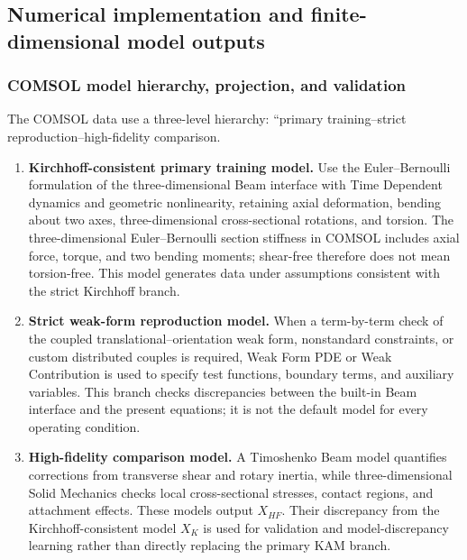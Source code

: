 \subsection{Numerical implementation and finite-dimensional model outputs}\label{sec:galerkin-2-11}

\subsubsection{COMSOL model hierarchy, projection, and validation}\label{sec:galerkin-2-11-1}

The COMSOL data use a three-level hierarchy: ``primary training--strict reproduction--high-fidelity comparison.

\begin{enumerate}
\def\labelenumi{\arabic{enumi}.}
\tightlist
\item
  \textbf{Kirchhoff-consistent primary training model.} Use the Euler--Bernoulli formulation of the three-dimensional Beam interface with Time Dependent dynamics and geometric nonlinearity, retaining axial deformation, bending about two axes, three-dimensional cross-sectional rotations, and torsion. The three-dimensional Euler--Bernoulli section stiffness in COMSOL includes axial force, torque, and two bending moments; shear-free therefore does not mean torsion-free\cite{COMSOLBeamInterface2025,COMSOLSectionStiffness2025}. This model generates data under assumptions consistent with the strict Kirchhoff branch.
\item
  \textbf{Strict weak-form reproduction model.} When a term-by-term check of the coupled translational--orientation weak form, nonstandard constraints, or custom distributed couples is required, Weak Form PDE or Weak Contribution is used to specify test functions, boundary terms, and auxiliary variables\cite{COMSOLWeakFormPDE2025,COMSOLWeakContribution2025}. This branch checks discrepancies between the built-in Beam interface and the present equations; it is not the default model for every operating condition.
\item
  \textbf{High-fidelity comparison model.} A Timoshenko Beam model quantifies corrections from transverse shear and rotary inertia, while three-dimensional Solid Mechanics checks local cross-sectional stresses, contact regions, and attachment effects. These models output \(X_{HF}\). Their discrepancy from the Kirchhoff-consistent model \(X_{K}\) is used for validation and model-discrepancy learning rather than directly replacing the primary KAM branch.
\end{enumerate}

